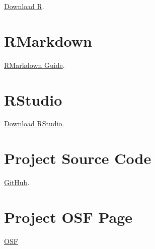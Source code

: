 \documentclass[
]{book}
\begin{document}
\href{https://cloud.r-project.org/}{Download R}.

\hypertarget{rmarkdown}{%
\section*{RMarkdown}\label{rmarkdown}}

\href{https://bookdown.org/yihui/rmarkdown/}{RMarkdown Guide}.

\hypertarget{rstudio}{%
\section*{RStudio}\label{rstudio}}

\href{https://rstudio.com/products/rstudio/download/\#download}{Download RStudio}.

\hypertarget{project-source-code}{%
\section*{Project Source Code}\label{project-source-code}}

\href{https://github.com/Peter-Kedron/COVID-19-Digital-Contact-Tracing-and-Geospatial-Technologies-and-Privacy}{GitHub}.

\hypertarget{project-osf-page}{%
\section*{Project OSF Page}\label{project-osf-page}}

\href{https://osf.io/kpvbq/}{OSF}

  
\end{document}

